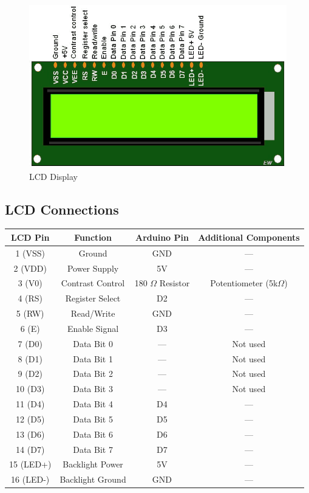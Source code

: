 \documentclass[journal]{IEEEtran}
\begin{document}
\begin{figure}[h]
\centering
\includegraphics[width=0.7\linewidth]{figs/1.png}
\caption{LCD Display}
\label{fig:circuit}
\end{figure}

\subsection{LCD Connections}
\begin{center}
\begin{tabular}{|c|c|c|c|}
    \hline
    \textbf{LCD Pin} & \textbf{Function} & \textbf{Arduino Pin} & \textbf{Additional Components} \\
    \hline
    1 (VSS)  & Ground          & GND     & --- \\
    2 (VDD)  & Power Supply    & 5V      & --- \\
    3 (V0)   & Contrast Control &  180 $\Omega$ Resistor & Potentiometer (5k$\Omega$) \\
    4 (RS)   & Register Select  & D2      & --- \\
    5 (RW)   & Read/Write       & GND     & --- \\
    6 (E)    & Enable Signal    & D3      & --- \\
    7 (D0)   & Data Bit 0       & ---     & Not used \\
    8 (D1)   & Data Bit 1       & ---     & Not used \\
    9 (D2)   & Data Bit 2       & ---     & Not used \\
    10 (D3)  & Data Bit 3       & ---     & Not used \\
    11 (D4)  & Data Bit 4       & D4      & --- \\
    12 (D5)  & Data Bit 5       & D5      & --- \\
    13 (D6)  & Data Bit 6       & D6      & --- \\
    14 (D7)  & Data Bit 7       & D7      & --- \\
    15 (LED+) & Backlight Power  & 5V      & ---\\
    16 (LED-) & Backlight Ground & GND     & --- \\
    \hline
\end{tabular}
\end{center}
\end{document}
